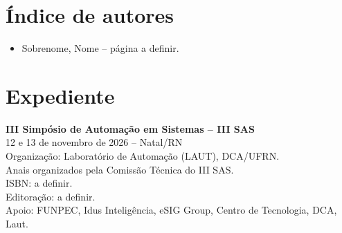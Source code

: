 \documentclass[12pt,a4paper,oneside,openany]{book}
\begin{document}


\backmatter
\chapter*{Índice de autores}

\begin{itemize}
  \item Sobrenome, Nome -- página a definir.
\end{itemize}

\chapter*{Expediente}

\noindent\textbf{III Simpósio de Automação em Sistemas -- III SAS}\\
12 e 13 de novembro de 2026 -- Natal/RN\\
Organização: Laboratório de Automação (LAUT), DCA/UFRN.\\

\vspace{0.5cm}
\noindent Anais organizados pela Comissão Técnica do III SAS.\\
\noindent ISBN: a definir.\\
\noindent Editoração: a definir.\\
\noindent Apoio: FUNPEC, Idus Inteligência, eSIG Group, Centro de Tecnologia, DCA, Laut.\\
\end{document}
